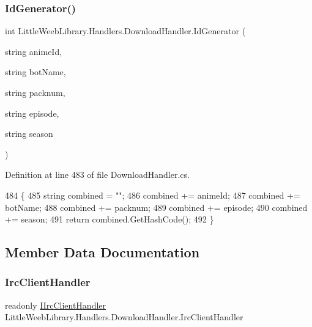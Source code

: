 \subsubsection{\texorpdfstring{Id\+Generator()}{IdGenerator()}}
{\footnotesize\ttfamily int Little\+Weeb\+Library.\+Handlers.\+Download\+Handler.\+Id\+Generator (\begin{DoxyParamCaption}\item[{string}]{anime\+Id,  }\item[{string}]{bot\+Name,  }\item[{string}]{packnum,  }\item[{string}]{episode,  }\item[{string}]{season }\end{DoxyParamCaption})\hspace{0.3cm}{\ttfamily [private]}}



Definition at line 483 of file Download\+Handler.\+cs.


\begin{DoxyCode}
484         \{
485             \textcolor{keywordtype}{string} combined = \textcolor{stringliteral}{""};
486             combined += animeId;
487             combined += botName;
488             combined += packnum;
489             combined += episode;
490             combined += season;
491             \textcolor{keywordflow}{return} combined.GetHashCode();
492         \}
\end{DoxyCode}


\subsection{Member Data Documentation}
\mbox{\label{class_little_weeb_library_1_1_handlers_1_1_download_handler_a0ffa906f8e42099ea4a822a33ae707cd}} 
\subsubsection{\texorpdfstring{Irc\+Client\+Handler}{IrcClientHandler}}
{\footnotesize\ttfamily readonly \mbox{\hyperlink{interface_little_weeb_library_1_1_handlers_1_1_i_irc_client_handler}{I\+Irc\+Client\+Handler}} Little\+Weeb\+Library.\+Handlers.\+Download\+Handler.\+Irc\+Client\+Handler\hspace{0.3cm}{\ttfamily [private]}}



